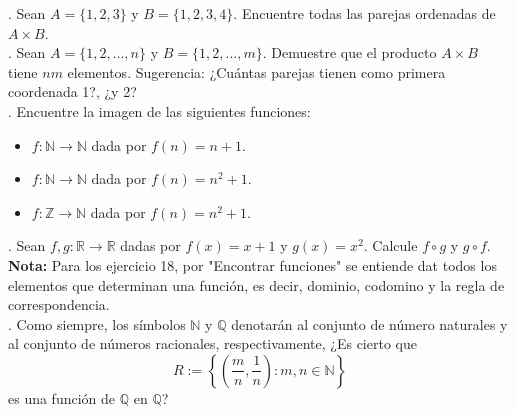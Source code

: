 \documentclass[letterpaper]{article}
\newcommand{\R}{\mathds{R}}
\newcommand{\Q}{\mathds{Q}}
\newcommand{\Z}{\mathds{Z}}
\newcommand{\N}{\mathds{N}}
\renewcommand{\*}{\cdot}
\theoremstyle{definition}
\begin{document}
. Sean $ A = \{ 1,2,3 \} $ y $ B =\{ 1,2,3,4 \} $. Encuentre todas las parejas ordenadas de $ A \times B $.\\

. Sean $ A = \{ 1,2, \dots, n \} $ y $ B = \{ 1,2, \dots, m \} $. Demuestre que el producto $ A \times B $ tiene $ nm $ elementos. Sugerencia: ¿Cuántas parejas tienen como primera coordenada 1?, ¿y 2?\\



. Encuentre la imagen de las siguientes funciones:
\begin{itemize}
	\item $ f : \N \to \N $ dada por $ f(n) = n + 1 $.
	\item $ f : \N \to \N $ dada por $ f(n) = n^2 + 1 $.
	\item $ f : \Z \to \N $ dada por $ f(n) = n^2 + 1 $.
\end{itemize}


. Sean $ f, g: \R \to \R $ dadas por $ f(x) = x + 1 $ y $ g(x) = x^2 $. Calcule $ f \circ g $ y $ g \circ f $.\\
\textbf{Nota:} Para los ejercicio 18, por "Encontrar funciones" se entiende dat todos los elementos que determinan una función, es decir, dominio, codomino y la regla de correspondencia.\\

. Como siempre, los símbolos $ \N $ y $ \Q $ denotarán al conjunto de número naturales y al conjunto de números racionales, respectivamente, ¿Es cierto que 
\[ R:= \left\lbrace \left(\dfrac{m}{n}, \dfrac{1}{n}\right): m, n \in \N \right\rbrace \]
es una función de $ \Q $ en $ \Q $?\\
\end{document}
